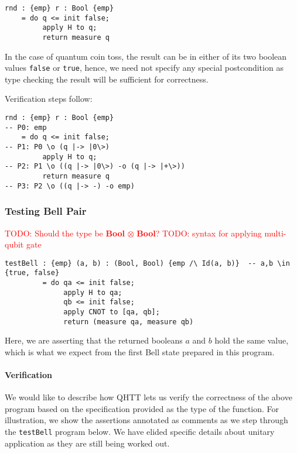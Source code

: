 \documentclass[acmsmall,nonacm,timestamp,review=false,anonymous=false]{acmart}
\newcommand{\type}[1]{\textrm{\textbf{#1}}}
\newcommand{\todo}[1]{\textcolor{red}{#1}}
\begin{document}
\begin{minipage}{0.95\linewidth}
\begin{lstlisting}[language=QHaskell]
rnd : {emp} r : Bool {emp}
    = do q <= init false;
         apply H to q;
         return measure q
\end{lstlisting}
\end{minipage}

In the case of quantum coin toss, the result can be in either of its two boolean values \texttt{false} or \texttt{true}, hence, we need not specify any special postcondition as type checking the result will be sufficient for correctness.

Verification steps follow:

\begin{minipage}{0.95\linewidth}
\begin{lstlisting}[language=QHaskell]
rnd : {emp} r : Bool {emp}
-- P0: emp
    = do q <= init false;
-- P1: P0 \o (q |-> |0\>)
         apply H to q;
-- P2: P1 \o ((q |-> |0\>) -o (q |-> |+\>))
         return measure q
-- P3: P2 \o ((q |-> -) -o emp)
\end{lstlisting}
\end{minipage}

\subsubsection{Testing Bell Pair}
\leavevmode
\todo{TODO: Should the type be \type{Bool} $\otimes$ \type{Bool}?}
\todo{TODO: syntax for applying multi-qubit gate}

\begin{minipage}{0.95\linewidth}
\begin{lstlisting}[language=QHaskell]
testBell : {emp} (a, b) : (Bool, Bool) {emp /\ Id(a, b)}  -- a,b \in {true, false}
         = do qa <= init false;
              apply H to qa;
              qb <= init false;
              apply CNOT to [qa, qb];
              return (measure qa, measure qb)
\end{lstlisting}
\end{minipage}

Here, we are asserting that the returned booleans $a$ and $b$ hold the same value, which is what we expect from the first Bell state prepared in this program.

\paragraph{Verification}
We would like to describe how QHTT lets us verify the correctness of the above program based on the specification provided as the type of the function. For illustration, we show the assertions annotated as comments as we step through the \texttt{testBell} program below. We have elided specific details about unitary application as they are still being worked out.
\end{document}
